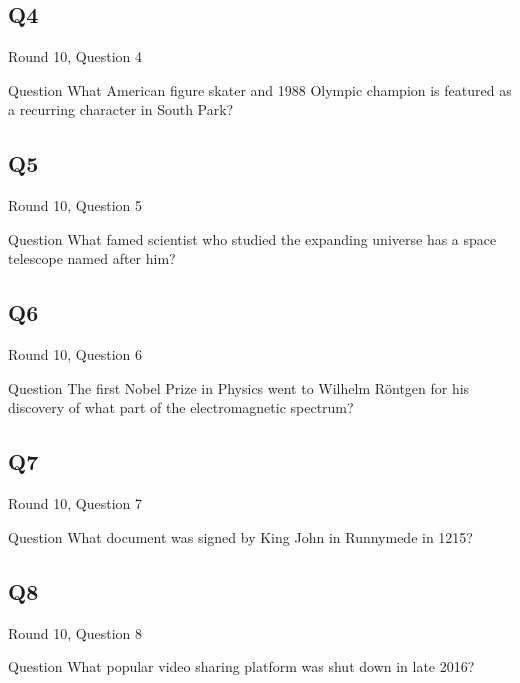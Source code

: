 \documentclass[11pt]{beamer}
\begin{document}
\subsection*{Q4}
\begin{frame}[t]{Round 10, Question 4}
\vspace{2em}
\begin{block}{Question}
What American figure skater and 1988 Olympic champion is featured as a recurring character in South Park\@?
\end{block}
\end{frame}
    

\subsection*{Q5}
\begin{frame}[t]{Round 10, Question 5}
\vspace{2em}
\begin{block}{Question}
What famed scientist who studied the expanding universe has a space telescope named after him\@?
\end{block}
\end{frame}
    

\subsection*{Q6}
\begin{frame}[t]{Round 10, Question 6}
\vspace{2em}
\begin{block}{Question}
The first Nobel Prize in Physics went to Wilhelm Röntgen for his discovery of what part of the electromagnetic spectrum\@?
\end{block}
\end{frame}
    

\subsection*{Q7}
\begin{frame}[t]{Round 10, Question 7}
\vspace{2em}
\begin{block}{Question}
What document was signed by King John in Runnymede in 1215\@?
\end{block}
\end{frame}
    

\subsection*{Q8}
\begin{frame}[t]{Round 10, Question 8}
\vspace{2em}
\begin{block}{Question}
What popular video sharing platform was shut down in late 2016\@?
\end{block}
\end{frame}
    
\end{document}
